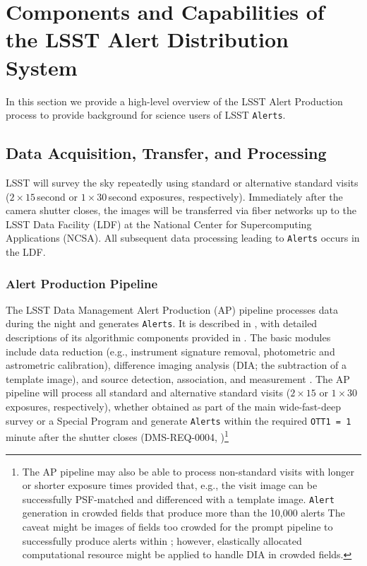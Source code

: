 \section{Components and Capabilities of the LSST Alert Distribution System}\label{sec:components}

In this section we provide a high-level overview of the LSST Alert Production process to provide background for science users of LSST \texttt{Alerts}.

\subsection{Data Acquisition, Transfer, and Processing}

LSST will survey the sky repeatedly using standard or alternative standard visits ($2\times15$\,second or $1\times30$\,second exposures, respectively).  
Immediately after the camera shutter closes, the images will be transferred via fiber networks up to the LSST Data Facility (LDF) at the National Center for Supercomputing Applications (NCSA).
All subsequent data processing leading to \texttt{Alerts} occurs in the LDF.

\subsubsection{Alert Production Pipeline}\label{sec:AP}

The LSST Data Management Alert Production (AP) pipeline processes data during the night and generates {\tt Alerts}.
It is described in , with detailed descriptions of its algorithmic components provided in .
The basic modules include data reduction (e.g., instrument signature removal, photometric and astrometric calibration), difference imaging analysis (DIA; the subtraction of a template image), and source detection, association, and measurement .
The AP pipeline will process all standard and alternative standard visits ($2\times15$ or $1\times30$ exposures, respectively), whether obtained as part of the main wide-fast-deep survey or a Special Program  and generate {\tt Alerts} within the required {\tt OTT1 = 1} minute after the shutter closes (DMS-REQ-0004, )\footnote{
The AP pipeline may also be able to process non-standard visits with longer or shorter exposure times provided that, e.g., the visit image can be successfully PSF-matched and differenced with a template image.
\texttt{Alert} generation in crowded fields that produce more than the 10,000 alerts 
The caveat might be images of fields too crowded for the prompt pipeline to successfully produce alerts within ; however, elastically allocated computational resource might be applied to handle DIA in crowded fields.
}

